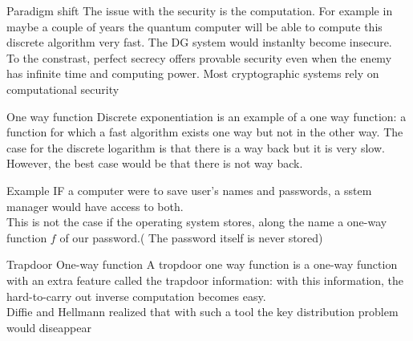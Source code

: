 \begin{parag}{Paradigm shift}
    The issue with the security is the computation. For example in maybe a couple of years the quantum computer will be able to compute this discrete algorithm very fast. The DG system would instanlty become insecure.\\
    To the constrast, perfect secrecy offers provable security even when the enemy has infinite time and computing power. Most cryptographic systems rely on computational security


\end{parag}
\begin{parag}{One way function}
    Discrete exponentiation is an example of a one  way function: a function for which a fast algorithm exists one way but not in the other way. The case for the discrete logarithm is that there is a way back but it is very slow. However, the best case would be that there is not way back.
    \begin{subparag}{Example}
        IF a computer were to save user's names and passwords, a sstem manager would have access to both.\\
        This is not the case if the operating system stores, along the name a one-way function $f$ of our password.( The password itself is never stored)
        
    \end{subparag}
    
\end{parag}

\begin{parag}{Trapdoor One-way function}
    A tropdoor one way function is a one-way function with an extra feature called the trapdoor information: with this information, the hard-to-carry out inverse computation becomes easy.\\
    Diffie and Hellmann realized that with such a tool the key distribution problem would diseappear

\end{parag}



